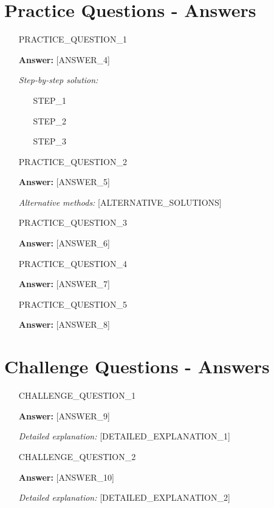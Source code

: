 \documentclass[a4paper,12pt]{article}
\begin{document}
\section{Practice Questions - Answers}

\begin{enumerate}[resume]
    \item [PRACTICE_QUESTION_1]
    
    \textcolor{oared}{\textbf{Answer:} [ANSWER_4]}
    
    \textit{Step-by-step solution:}
    \begin{enumerate}[label=\alph*)]
        \item [STEP_1]
        \item [STEP_2]
        \item [STEP_3]
    \end{enumerate}
    
    \item [PRACTICE_QUESTION_2]
    
    \textcolor{oared}{\textbf{Answer:} [ANSWER_5]}
    
    \textit{Alternative methods:} [ALTERNATIVE_SOLUTIONS]
    
    \item [PRACTICE_QUESTION_3]
    
    \textcolor{oared}{\textbf{Answer:} [ANSWER_6]}
    
    \item [PRACTICE_QUESTION_4]
    
    \textcolor{oared}{\textbf{Answer:} [ANSWER_7]}
    
    \item [PRACTICE_QUESTION_5]
    
    \textcolor{oared}{\textbf{Answer:} [ANSWER_8]}
\end{enumerate}

\section{Challenge Questions - Answers}

\begin{enumerate}[resume]
    \item [CHALLENGE_QUESTION_1]
    
    \textcolor{oared}{\textbf{Answer:} [ANSWER_9]}
    
    \textit{Detailed explanation:} [DETAILED_EXPLANATION_1]
    
    \item [CHALLENGE_QUESTION_2]
    
    \textcolor{oared}{\textbf{Answer:} [ANSWER_10]}
    
    \textit{Detailed explanation:} [DETAILED_EXPLANATION_2]
\end{enumerate}
\end{document}
